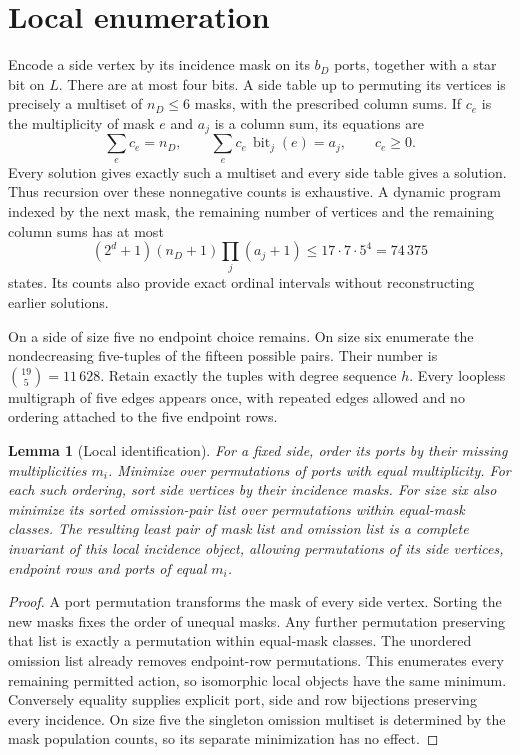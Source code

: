 \documentclass[11pt]{article}
\newtheorem{lemma}[theorem]{Lemma}
\begin{document}
\section*{Local enumeration}

Encode a side vertex by its incidence mask on its $b_D$ ports, together
with a star bit on $L$. There are at most four bits. A side table up to
permuting its vertices is precisely a multiset of $n_D\leq6$ masks,
with the prescribed column sums. If $c_e$ is the multiplicity of mask $e$
and $a_j$ is a column sum, its equations are
\[
 \sum_e c_e=n_D,\qquad
 \sum_e c_e\,\operatorname{bit}_j(e)=a_j,\qquad c_e\geq0.
\]
Every solution gives exactly such a multiset and every side table gives
a solution. Thus recursion over these nonnegative counts is exhaustive.
A dynamic program indexed by the next mask, the remaining number of
vertices and the remaining column sums has at most
\[
 (2^d+1)(n_D+1)\prod_j(a_j+1)
 \leq17\cdot7\cdot5^4=74\,375
\]
states. Its counts also provide exact ordinal intervals without
reconstructing earlier solutions.

On a side of size five no endpoint choice remains. On size six enumerate
the nondecreasing five-tuples of the fifteen possible pairs. Their number
is $\binom{19}{5}=11\,628$. Retain exactly the tuples with degree sequence
$h$. Every loopless multigraph of five edges appears once, with repeated
edges allowed and no ordering attached to the five endpoint rows.

\begin{lemma}[Local identification]
For a fixed side, order its ports by their missing multiplicities $m_i$.
Minimize over permutations of ports with equal multiplicity. For each
such ordering, sort side vertices by their incidence masks. For size six
also minimize its sorted omission-pair list over permutations within
equal-mask classes. The resulting least pair of mask list and omission
list is a complete invariant of this local incidence object, allowing
permutations of its side vertices, endpoint rows and ports of equal $m_i$.
\end{lemma}
\begin{proof}
A port permutation transforms the mask of every side vertex. Sorting the
new masks fixes the order of unequal masks. Any further permutation
preserving that list is exactly a permutation within equal-mask classes.
The unordered omission list already removes endpoint-row permutations.
This enumerates every remaining permitted action, so isomorphic local
objects have the same minimum. Conversely equality supplies explicit
port, side and row bijections preserving every incidence. On size five
the singleton omission multiset is determined by the mask population
counts, so its separate minimization has no effect.
\end{proof}
\end{document}
